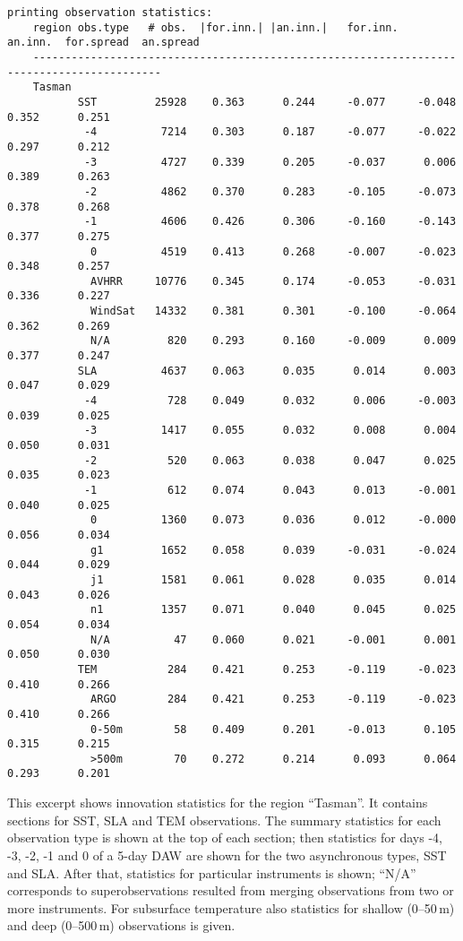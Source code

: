 \documentclass[11pt]{report}
\begin{document}
\begin{Verbatim}[frame=single,fontsize=\footnotesize]
  printing observation statistics:
    region obs.type   # obs.  |for.inn.| |an.inn.|   for.inn.   an.inn.  for.spread  an.spread
    ------------------------------------------------------------------------------------------
    Tasman
           SST         25928    0.363      0.244     -0.077     -0.048      0.352      0.251  
            -4          7214    0.303      0.187     -0.077     -0.022      0.297      0.212  
            -3          4727    0.339      0.205     -0.037      0.006      0.389      0.263  
            -2          4862    0.370      0.283     -0.105     -0.073      0.378      0.268  
            -1          4606    0.426      0.306     -0.160     -0.143      0.377      0.275  
             0          4519    0.413      0.268     -0.007     -0.023      0.348      0.257  
             AVHRR     10776    0.345      0.174     -0.053     -0.031      0.336      0.227  
             WindSat   14332    0.381      0.301     -0.100     -0.064      0.362      0.269  
             N/A         820    0.293      0.160     -0.009      0.009      0.377      0.247  
           SLA          4637    0.063      0.035      0.014      0.003      0.047      0.029  
            -4           728    0.049      0.032      0.006     -0.003      0.039      0.025  
            -3          1417    0.055      0.032      0.008      0.004      0.050      0.031  
            -2           520    0.063      0.038      0.047      0.025      0.035      0.023  
            -1           612    0.074      0.043      0.013     -0.001      0.040      0.025  
             0          1360    0.073      0.036      0.012     -0.000      0.056      0.034  
             g1         1652    0.058      0.039     -0.031     -0.024      0.044      0.029  
             j1         1581    0.061      0.028      0.035      0.014      0.043      0.026  
             n1         1357    0.071      0.040      0.045      0.025      0.054      0.034  
             N/A          47    0.060      0.021     -0.001      0.001      0.050      0.030  
           TEM           284    0.421      0.253     -0.119     -0.023      0.410      0.266  
             ARGO        284    0.421      0.253     -0.119     -0.023      0.410      0.266  
             0-50m        58    0.409      0.201     -0.013      0.105      0.315      0.215  
             >500m        70    0.272      0.214      0.093      0.064      0.293      0.201  
\end{Verbatim}
This excerpt shows innovation statistics for the region ``Tasman''.
It contains sections for SST, SLA and TEM observations.
The summary statistics for each observation type is shown at the top of each section; then statistics for days -4, -3, -2, -1 and 0 of a 5-day DAW are shown for the two asynchronous types, SST and SLA.
After that, statistics for particular instruments is shown; ``N/A'' corresponds to superobservations resulted from merging observations from two or more instruments.
For subsurface temperature also statistics for shallow (0--50\,m) and deep (0--500\,m) observations is given.
\end{document}
